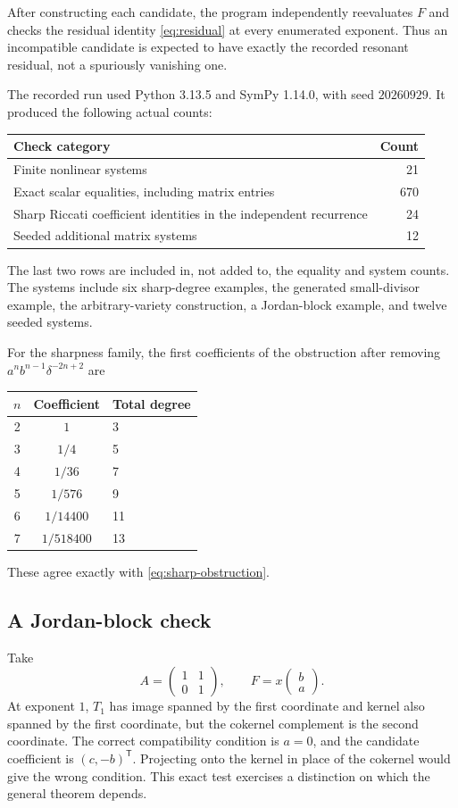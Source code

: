 \documentclass[11pt,a4paper]{article}
\numberwithin{equation}{section}
\theoremstyle{definition}
\theoremstyle{remark}
\begin{document}
After constructing each candidate, the program independently reevaluates
$F$ and checks the residual identity \eqref{eq:residual} at every enumerated
exponent. Thus an incompatible candidate is expected to have exactly the
recorded resonant residual, not a spuriously vanishing one.

The recorded run used Python 3.13.5 and SymPy 1.14.0, with seed $20260929$.
It produced the following actual counts:
\begin{center}
\begin{tabular}{lr}
\toprule
Check category & Count\\
\midrule
Finite nonlinear systems & 21\\
Exact scalar equalities, including matrix entries & 670\\
Sharp Riccati coefficient identities in the independent recurrence & 24\\
Seeded additional matrix systems & 12\\
\bottomrule
\end{tabular}
\end{center}
The last two rows are included in, not added to, the equality and system
counts. The systems include six sharp-degree examples, the generated
small-divisor example, the arbitrary-variety construction, a Jordan-block
example, and twelve seeded systems.

For the sharpness family, the first coefficients of the obstruction after
removing $a^n b^{n-1}\delta^{-2n+2}$ are
\begin{center}
\begin{tabular}{ccl}
\toprule
$n$ & Coefficient & Total degree\\
\midrule
2 & $1$ & 3\\
3 & $1/4$ & 5\\
4 & $1/36$ & 7\\
5 & $1/576$ & 9\\
6 & $1/14400$ & 11\\
7 & $1/518400$ & 13\\
\bottomrule
\end{tabular}
\end{center}
These agree exactly with \eqref{eq:sharp-obstruction}.

\subsection{A Jordan-block check}
Take
\[
 A=\begin{pmatrix}1&1\\0&1\end{pmatrix},\qquad
 F=x\begin{pmatrix}b\\a\end{pmatrix}.
\]
At exponent $1$, $T_1$ has image spanned by the first coordinate and
kernel also spanned by the first coordinate, but the cokernel complement
is the second coordinate. The correct compatibility condition is $a=0$,
and the candidate coefficient is $(c,-b)^{\mathsf T}$. Projecting onto
the kernel in place of the cokernel would give the wrong condition.
This exact test exercises a distinction on which the general theorem
depends.
\end{document}
